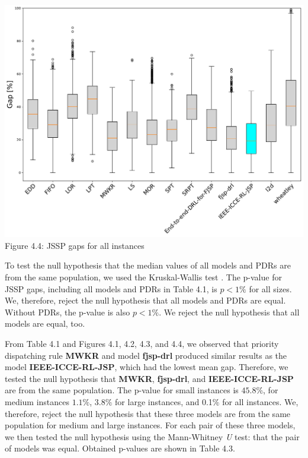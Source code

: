 \begin{center}
    \includegraphics[width=0.9\linewidth]{images/horizontal_boxplot_jssp_all.pdf}\\
    Figure 4.4: JSSP gaps for all instances
\end{center}

To test the null hypothesis that the median values of all models and PDRs are from the same population, we used the Kruskal-Wallis test \cite{doi:10.1080/01621459.1952.10483441}. The p-value for JSSP gaps, including all models and PDRs in Table 4.1, is $p < 1\%$ for all sizes. We, therefore, reject the null hypothesis that all models and PDRs are equal. Without PDRs, the p-value is also $p < 1\%$. We reject the null hypothesis that all models are equal, too.
\par  
From Table 4.1 and Figures 4.1, 4.2, 4.3, and 4.4, we observed that priority dispatching rule \textbf{MWKR} and model \textbf{fjsp-drl} produced similar results as the model \textbf{IEEE-ICCE-RL-JSP}, which had the lowest mean gap. Therefore, we tested the null hypothesis that \textbf{MWKR}, \textbf{fjsp-drl}, and \textbf{IEEE-ICCE-RL-JSP} are from the same population. The p-value for small instances is $45.8\%$, for medium instances $1.1\%$, $3.8\%$ for large instances, and 0.1$\%$ for all instances. We, therefore, reject the null hypothesis that these three models are from the same population for medium and large instances.
For each pair of these three models, we then tested the null hypothesis using the Mann-Whitney \textit{U} test: that the pair of models was equal. Obtained p-values are shown in Table 4.3.

